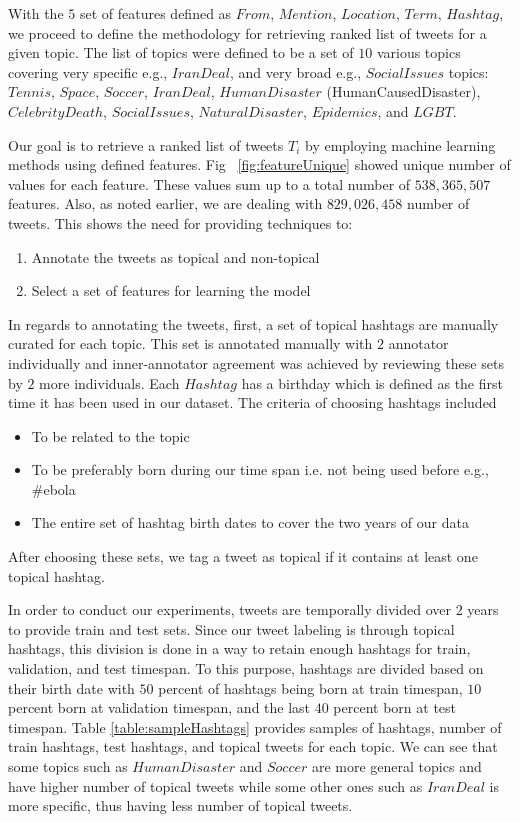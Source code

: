 With the $5$ set of features defined as $From$, $Mention$, $Location$, $Term$, $Hashtag$, we proceed to define the methodology for retrieving ranked list of tweets for a given topic. The list of topics were defined to be a set of $10$ various topics covering very specific e.g., $IranDeal$, and very broad e.g., $SocialIssues$ topics: $Tennis$, $Space$, $Soccer$, $IranDeal$, $HumanDisaster$ (HumanCausedDisaster), $CelebrityDeath$, $SocialIssues$, $NaturalDisaster$, $Epidemics$, and $LGBT$. 

Our goal is to retrieve a ranked list of tweets $T_i$ by employing machine learning methods using defined features. Fig ~\ref{fig:featureUnique} showed unique number of values for each feature. These values sum up to a total number of $538,365,507$ features. Also, as noted earlier, we are dealing with $829,026,458$ number of tweets. This shows the need for providing techniques to:

\begin{enumerate}
\item Annotate the tweets as topical and non-topical
\item Select a set of features for learning the model
\end{enumerate}

In regards to annotating the tweets, first, a set of topical hashtags are manually curated for each topic. This set is annotated manually with $2$ annotator individually and inner-annotator agreement was achieved by reviewing these sets by $2$ more individuals. Each $Hashtag$ has a birthday which is defined as the first time it has been used in our dataset. The criteria of choosing hashtags included
\begin{itemize}
\item To be related to the topic
\item To be preferably born during our time span i.e. not being used before e.g., \#ebola
\item The entire set of hashtag birth dates to cover the two years of our data
\end{itemize}
After choosing these sets, we tag a tweet as topical if it contains at least one topical hashtag. 

\label{label:split}
In order to conduct our experiments, tweets are temporally divided over $2$ years to provide train and test sets. Since our tweet labeling is through topical hashtags, this division is done in a way to retain enough hashtags for train, validation, and test timespan. To this purpose, hashtags are divided based on their birth date with $50$ percent of hashtags being born at train timespan, $10$ percent born at validation timespan, and the last $40$ percent born at test timespan.
Table \ref{table:sampleHashtags} provides samples of hashtags, number of train hashtags, test hashtags, and topical tweets for each topic. We can see that some topics such as $HumanDisaster$ and $Soccer$ are more general topics and have higher number of topical tweets while some other ones such as $IranDeal$ is more specific, thus having less number of topical tweets.

